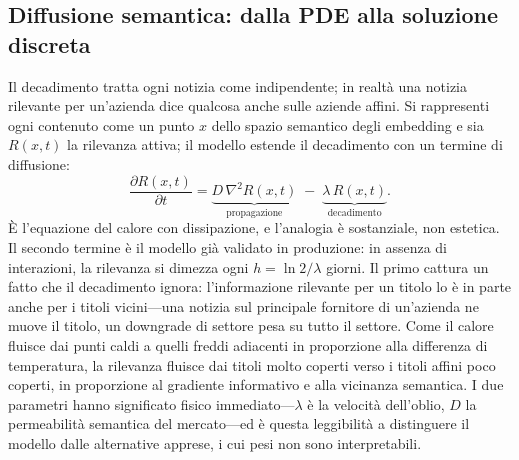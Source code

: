 \documentclass[a4paper,11pt]{article}
\begin{document}
\subsection{Diffusione semantica: dalla PDE alla soluzione discreta}

Il decadimento tratta ogni notizia come indipendente; in realtà una notizia rilevante per un'azienda dice qualcosa anche sulle aziende affini. Si rappresenti ogni contenuto come un punto $x$ dello spazio semantico degli embedding e sia $R(x,t)$ la rilevanza attiva; il modello estende il decadimento con un termine di diffusione:
\[
\frac{\partial R(x,t)}{\partial t} = \underbrace{D\,\nabla^2 R(x,t)}_{\text{propagazione}} \;-\; \underbrace{\lambda\, R(x,t)}_{\text{decadimento}}.
\]
È l'equazione del calore con dissipazione, e l'analogia è sostanziale, non estetica. Il secondo termine è il modello già validato in produzione: in assenza di interazioni, la rilevanza si dimezza ogni $h=\ln 2/\lambda$ giorni. Il primo cattura un fatto che il decadimento ignora: l'informazione rilevante per un titolo lo è in parte anche per i titoli vicini---una notizia sul principale fornitore di un'azienda ne muove il titolo, un downgrade di settore pesa su tutto il settore. Come il calore fluisce dai punti caldi a quelli freddi adiacenti in proporzione alla differenza di temperatura, la rilevanza fluisce dai titoli molto coperti verso i titoli affini poco coperti, in proporzione al gradiente informativo e alla vicinanza semantica. I due parametri hanno significato fisico immediato---$\lambda$ è la velocità dell'oblio, $D$ la permeabilità semantica del mercato---ed è questa leggibilità a distinguere il modello dalle alternative apprese, i cui pesi non sono interpretabili.
\end{document}
